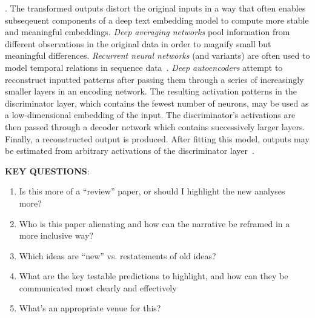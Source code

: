   .  The transformed outputs distort the original inputs in a way that often enables subseqeuent components of a deep text embedding model to compute more stable and meaningful embeddings.  \textit{Deep averaging networks} pool information from different observations in the original data in order to magnify small but meaningful differences.  \textit{Recurrent neural networks} (and variants) are often used to model temporal relations in sequence data~\citep[the deep averaging network and recurrent neural network diagrams are loosely inspired by figures from][]{IyyeEtal15}.  \textit{Deep autoencoders} attempt to reconstruct inputted patterns after passing them through a series of increasingly smaller layers in an encoding network.  The resulting activation patterns in the discriminator layer, which contains the fewest number of neurons, may be used as a low-dimensional embedding of the input.  The discriminator's activations are then passed through a decoder network which contains successively larger layers.  Finally, a reconstructed output is produced.  After fitting this model, outputs may be estimated from arbitrary activations of the discriminator layer~\citep[diagram loosly inspired by][]{YousHame17}.


\textbf{KEY QUESTIONS}:
\begin{enumerate}
  \item Is this more of a ``review'' paper, or should I highlight the new analyses more?
  \item Who is this paper alienating and how can the narrative be reframed in a more inclusive way?
  \item Which ideas are ``new'' vs. restatements of old ideas?
  \item What are the key testable predictions to highlight, and how can they be communicated most clearly and effectively
  \item What's an appropriate venue for this?
\end{enumerate}


